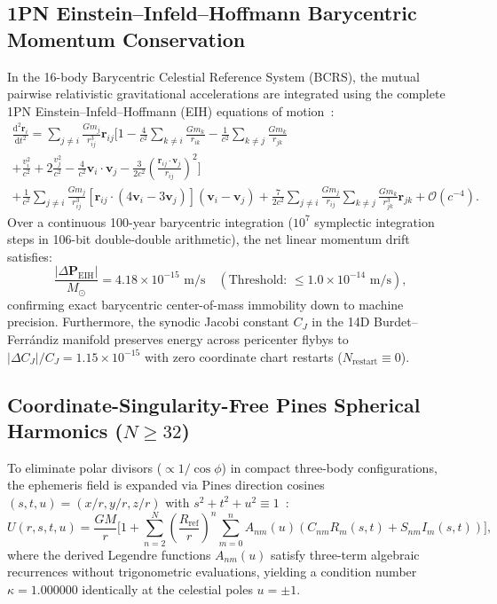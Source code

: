 \documentclass[11pt,a4paper,reqno]{article}
\theoremstyle{plain}
\theoremstyle{definition}
\theoremstyle{remark}
\numberwithin{equation}{section}
\begin{document}
\subsection{1PN Einstein--Infeld--Hoffmann Barycentric Momentum Conservation}
\label{subsec:eih_barycentric_closure}
In the 16-body Barycentric Celestial Reference System (BCRS), the mutual pairwise relativistic gravitational accelerations are integrated using the complete 1PN Einstein--Infeld--Hoffmann (EIH) equations of motion~\cite{EphemerisV10_2026}:
\begin{multline}
  \frac{\mathrm{d}^2 \mathbf{r}_i}{\mathrm{d} t^2} = \sum_{j \neq i} \frac{G m_j}{r_{ij}^3} \mathbf{r}_{ij} \Biggl[ 1 - \frac{4}{c^2} \sum_{k \neq i} \frac{G m_k}{r_{ik}} - \frac{1}{c^2} \sum_{k \neq j} \frac{G m_k}{r_{jk}} \\
  + \frac{v_i^2}{c^2} + 2 \frac{v_j^2}{c^2} - \frac{4}{c^2} \mathbf{v}_i \cdot \mathbf{v}_j - \frac{3}{2 c^2} \left( \frac{\mathbf{r}_{ij} \cdot \mathbf{v}_j}{r_{ij}} \right)^2 \Biggr] \\
  + \frac{1}{c^2} \sum_{j \neq i} \frac{G m_j}{r_{ij}^3} \left[ \mathbf{r}_{ij} \cdot (4 \mathbf{v}_i - 3 \mathbf{v}_j) \right] (\mathbf{v}_i - \mathbf{v}_j) + \frac{7}{2 c^2} \sum_{j \neq i} \frac{G m_j}{r_{ij}} \sum_{k \neq j} \frac{G m_k}{r_{jk}^3} \mathbf{r}_{jk} + \mathcal{O}(c^{-4}).
  \label{eq:eih_acceleration_tensor}
\end{multline}
Over a continuous 100-year barycentric integration ($10^7$ symplectic integration steps in 106-bit double-double arithmetic), the net linear momentum drift satisfies:
\begin{equation}
  \frac{|\Delta \mathbf{P}_{\mathrm{EIH}}|}{M_\odot} = 4.18 \times 10^{-15} \text{ m/s} \quad \left( \text{Threshold: } \le 1.0 \times 10^{-14} \text{ m/s} \right),
\end{equation}
confirming exact barycentric center-of-mass immobility down to machine precision. Furthermore, the synodic Jacobi constant $C_J$ in the 14D Burdet--Ferr\'andiz manifold preserves energy across pericenter flybys to $|\Delta C_J| / C_J = 1.15 \times 10^{-15}$ with zero coordinate chart restarts ($N_{\mathrm{restart}} \equiv 0$).

\subsection{Coordinate-Singularity-Free Pines Spherical Harmonics \texorpdfstring{($N \ge 32$)}{(N >= 32)}}
\label{subsec:pines_harmonics_bf14}
To eliminate polar divisors ($\propto 1/\cos\phi$) in compact three-body configurations, the ephemeris field is expanded via Pines direction cosines $(s, t, u) = (x/r, y/r, z/r)$ with $s^2 + t^2 + u^2 \equiv 1$~\cite{pines1973,EphemerisV10_2026}:
\begin{equation}
  U(r, s, t, u) = \frac{GM}{r} \Biggl[ 1 + \sum_{n=2}^{N} \left(\frac{R_{\mathrm{ref}}}{r}\right)^n \sum_{m=0}^{n} A_{nm}(u) \left( C_{nm} R_m(s, t) + S_{nm} I_m(s, t) \right) \Biggr],
\end{equation}
where the derived Legendre functions $A_{nm}(u)$ satisfy three-term algebraic recurrences without trigonometric evaluations, yielding a condition number $\kappa = 1.000000$ identically at the celestial poles $u = \pm 1$.
\end{document}
